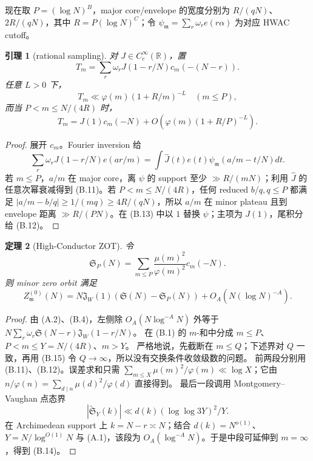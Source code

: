 \documentclass[11pt,a4paper]{ctexart}
\newtheorem{theorem}{定理}[section]
\newtheorem{lemma}[theorem]{引理}
\theoremstyle{definition}
\newcommand{\1}{\mathbf 1}
\begin{document}
现在取 $P=(\log N)^B$，major core/envelope 的宽度分别为
$R/(qN)$、$2R/(qN)$，其中 $R=P(\log N)^C$；令
$\psi_{\mathfrak m}=\sum_r\omega_re(r\alpha)$ 为对应 HWAC cutoff。

\begin{lemma}[rational sampling]
对 $J\in C_c^\infty(\mathbb R)$，置
\[
T_m=\sum_r\omega_rJ(1-r/N)c_m(-(N-r)).                 \tag{B.10}
\]
任意 $L>0$ 下，
\[
T_m\ll\varphi(m)(1+R/m)^{-L}\quad(m\le P),             \tag{B.11}
\]
而当 $P<m\le N/(4R)$ 时，
\[
T_m=J(1)c_m(-N)
+O(\varphi(m)(1+R/P)^{-L}).                            \tag{B.12}
\]
\end{lemma}

\begin{proof}
展开 $c_m$。Fourier inversion 给
\[
\sum_r\omega_rJ(1-r/N)e(ar/m)
=\int\widehat J(t)e(t)\psi_{\mathfrak m}(a/m-t/N)dt.  \tag{B.13}
\]
若 $m\le P$，$a/m$ 在 major core，离 $\psi$ 的 support 至少
$\gg R/(mN)$；利用 $\widehat J$ 的任意次幂衰减得到 (B.11)。若
$P<m\le N/(4R)$，任何 reduced $b/q,q\le P$ 都满足
$|a/m-b/q|\ge1/(mq)\ge4R/(qN)$，所以 $a/m$ 在 minor plateau 且到
envelope 距离 $\gg R/(PN)$。在 (B.13) 中以 $1$ 替换 $\psi$；主项为
$J(1)$，尾积分给 (B.12)。
\end{proof}

\begin{theorem}[High-Conductor ZOT]
令
\[
\mathfrak S_P(N)=\sum_{m\le P}\frac{\mu(m)^2}{\varphi(m)^2}c_m(-N).
\]
则 minor zero orbit 满足
\[
\boxed{Z_{\mathfrak m}^{(0)}(N)
=N\mathfrak J_W(1)(\mathfrak S(N)-\mathfrak S_P(N))
+O_A(N(\log N)^{-A}).}                                 \tag{B.14}
\]
\end{theorem}

\begin{proof}
由 (A.2)、(B.4)，左侧除 $O_A(N\log^{-A}N)$ 外等于
$N\sum_r\omega_r\mathfrak S(N-r)\mathfrak J_W(1-r/N)$。
在 (B.1) 的 $m$-和中分成 $m\le P$、$P<m\le Y=N/(4R)$、$m>Y$。
严格地说，先截断在 $m\le Q$；下述界对 $Q$ 一致，再用 (B.15)
令 $Q\to\infty$，所以没有交换条件收敛级数的问题。
前两段分别用 (B.11)、(B.12)。误差求和只需
$\sum_{m\le X}\mu(m)^2/\varphi(m)\ll\log X$；它由
$n/\varphi(n)=\sum_{d\mid n}\mu(d)^2/\varphi(d)$ 直接得到。
最后一段调用 Montgomery--Vaughan 点态界
\[
|\widetilde{\mathfrak S}_Y(k)|
\ll d(k)(\log\log3Y)^2/Y.                              \tag{B.15}
\]
在 Archimedean support 上 $k=N-r\asymp N$；结合
$d(k)=N^{o(1)}$、$Y=N/\log^{O(1)}N$ 与 (A.1)，该段为
$O_A(\log^{-A}N)$。于是中段可延伸到 $m=\infty$，得到 (B.14)。
\end{proof}
\end{document}
